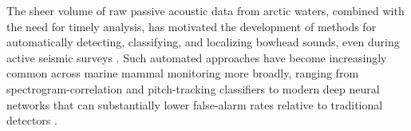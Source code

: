 \documentclass[preprint,NumberedRefs]{JASAnew}
\begin{document}



The sheer volume of raw passive acoustic data from arctic waters, combined with the
need for timely analysis, has motivated the development of methods for automatically
detecting, classifying, and localizing bowhead sounds, even during active seismic
surveys \cite{thode2012automated}. Such automated approaches have become increasingly
common across marine mammal monitoring more broadly, ranging from spectrogram-correlation
and pitch-tracking classifiers \cite{mellinger2000bowhead, baumgartner2011generalized}
to modern deep neural networks that can substantially lower false-alarm rates relative
to traditional detectors \cite{shiu2020deep, allen2021convolutional}.
\end{document}
